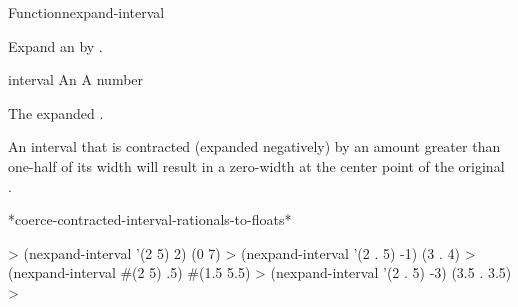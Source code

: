 \documentclass[10pt,twoside,english,pdftex]{article}
\begin{document}
\begin{functiondoc}{Function}{nexpand-interval}%
  {
    \returns{} }
%
%

\fnsyntax

\fnpurpose Expand an  by .

\fnpackage {}

\fnmodule {}

\fnargs
\begin{args}{interval}
\arg[interval] An 
\arg[amount] A number
\end{args}

\fnreturns The expanded .

\fndescription An interval that is contracted (expanded negatively) by an
amount greater than one-half of its width will result in a zero-width
 at the center point of the original .

\begin{alsos}{*coerce-contracted-interval-rationals-to-floats*}
\end{alsos}

\fnexamples
%
\W\supp
\begin{example}
  > (nexpand-interval '(2 5) 2)
  (0 7)
  > (nexpand-interval '(2 . 5) -1)
  (3 . 4)\goodpagebreak
  > (nexpand-interval #(2 5) .5)
  #(1.5 5.5)
  > (nexpand-interval '(2 . 5) -3)
  (3.5 . 3.5)
  >
\end{example}

\end{functiondoc}

\end{document}
